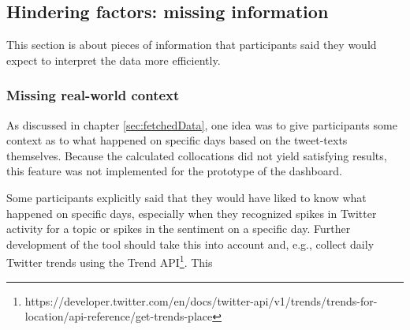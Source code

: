 \subsection{Hindering factors: missing information}
This section is about pieces of information that participants said they would expect to interpret the data more efficiently.

\subsubsection*{Missing real-world context}
As discussed in chapter \ref{sec:fetchedData}, one idea was to give participants some context as to what happened on specific days based on the tweet-texts themselves. Because the calculated collocations did not yield satisfying results, this feature was not implemented for the prototype of the dashboard.

Some participants explicitly said that they would have liked to know what happened on specific days, especially when they recognized spikes in Twitter activity for a topic or spikes in the sentiment on a specific day. Further development of the tool should take this into account and, e.g., collect daily Twitter trends using the Trend API\footnote{https://developer.twitter.com/en/docs/twitter-api/v1/trends/trends-for-location/api-reference/get-trends-place}. This 